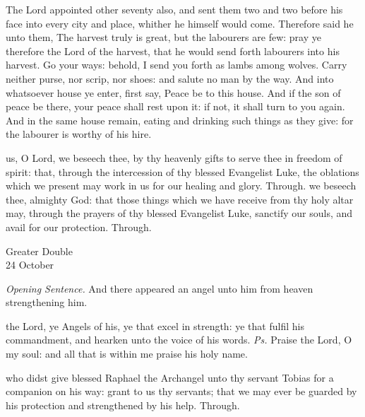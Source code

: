  The Lord appointed other seventy also, and sent them two and two before his face into every city and place, whither he himself would come. Therefore said he unto them, The harvest truly is great, but the labourers are few: pray ye therefore the Lord of the harvest, that he would send forth labourers into his harvest. Go your ways: behold, I send you forth as lambs among wolves. Carry neither purse, nor scrip, nor shoes: and salute no man by the way. And into whatsoever house ye enter, first say, Peace be to this house. And if the son of peace be there, your peace shall rest upon it: if not, it shall turn to you again. And in the same house remain, eating and drinking such things as they give: for the labourer is worthy of his hire.

\secret
{} us, O Lord, we beseech thee, by thy heavenly gifts to serve thee in freedom of spirit: that, through the intercession of thy blessed Evangelist Luke, the oblations which we present may work in us for our healing and glory. Through.
\postcommunion
{} we beseech thee, almighty God: that those things which we have receive from thy holy altar may, through the prayers of thy blessed Evangelist Luke, sanctify our souls, and avail for our protection. Through.

\begin{inhead}
	{Greater Double\\
		24 October}
\end{inhead}
\par\noindent
\textit{Opening Sentence.} And there appeared an angel unto him from heaven strengthening him.

\introit
{} the Lord, ye Angels of his, ye that excel in strength: ye that fulfil his commandment, and hearken unto the voice of his words. \textit{Ps.} Praise the Lord, O my soul: and all that is within me praise his holy name.

\collect
{} who didst give blessed Raphael the Archangel unto thy servant Tobias for a companion on his way: grant to us thy servants; that we may ever be guarded by his protection and strengthened by his help. Through.

